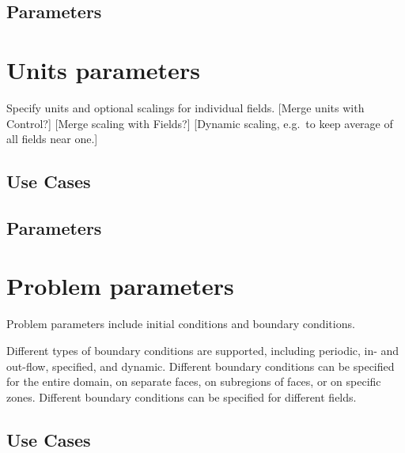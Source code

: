 \documentclass{book}
\begin{document}
\subsection{Parameters}

\section{Units parameters} \label{s:units}

 Specify units and optional scalings for individual
 fields.  [Merge units with Control?] [Merge scaling with Fields?] 
 [Dynamic scaling, e.g.~to keep average of all fields near one.]

\subsection{Use Cases}
\subsection{Parameters}

\section{Problem parameters} \label{s:problem}

Problem parameters include initial conditions and boundary conditions.

Different types of boundary conditions are supported, including
periodic, in- and out-flow, specified, and dynamic.  Different
boundary conditions can be specified for the entire domain, on
separate faces, on subregions of faces, or on specific zones.
Different boundary conditions can be specified for different fields.
\subsection{Use Cases}
\end{document}
